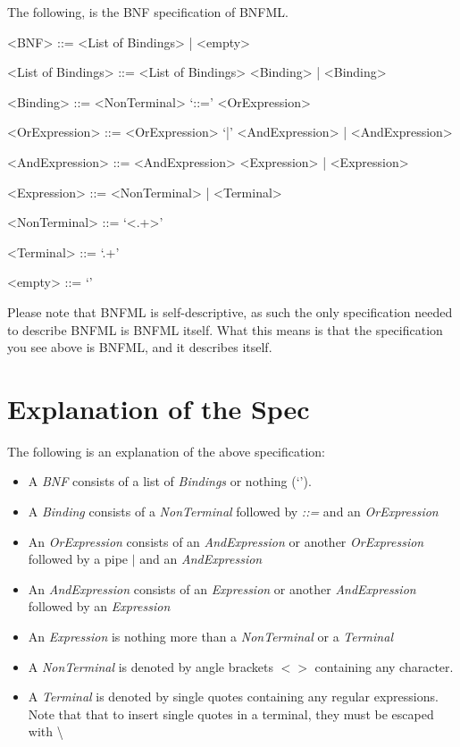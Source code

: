 \documentclass{scrreprt}
\begin{document}
    The following, is the BNF specification of BNFML.

    \begin{grammar}

        <BNF> ::= <List of Bindings> | <empty>

        <List of Bindings> ::= <List of Bindings> <Binding> | <Binding>

        <Binding> ::= <NonTerminal> `::=' <OrExpression>

        <OrExpression> ::= <OrExpression> `|' <AndExpression> | <AndExpression>

        <AndExpression> ::= <AndExpression> <Expression> | <Expression>

        <Expression> ::= <NonTerminal> | <Terminal>
    
        <NonTerminal> ::= `<.+>'
        
        <Terminal> ::= `.+'

        <empty> ::= `'

    \end{grammar}
    
    Please note that BNFML is self-descriptive, as such the only specification needed to describe BNFML is BNFML itself. What this means is that the specification you see above is BNFML,
    and it describes itself.

\section{Explanation of the Spec}

The following is an explanation of the above specification:

\begin{itemize}
    \item A \emph{BNF} consists of a list of \emph{Bindings} or nothing (`').
    \item A \emph{Binding} consists of a \emph{NonTerminal} followed by \emph{::=} and an \emph{OrExpression}
    \item An \emph{OrExpression} consists of an \emph{AndExpression} or another \emph{OrExpression} followed by a pipe \emph{$|$} and an \emph{AndExpression}
    \item An \emph{AndExpression} consists of an \emph{Expression} or another \emph{AndExpression} followed by an \emph{Expression}
    \item An \emph{Expression} is nothing more than a \emph{NonTerminal} or a \emph{Terminal}
    \item A \emph{NonTerminal} is denoted by angle brackets $< >$ containing any character.
    \item A \emph{Terminal} is denoted by single quotes containing any regular expressions. Note that that to insert single quotes in a terminal, they must be escaped with \textbackslash
\end{itemize}
\end{document}
